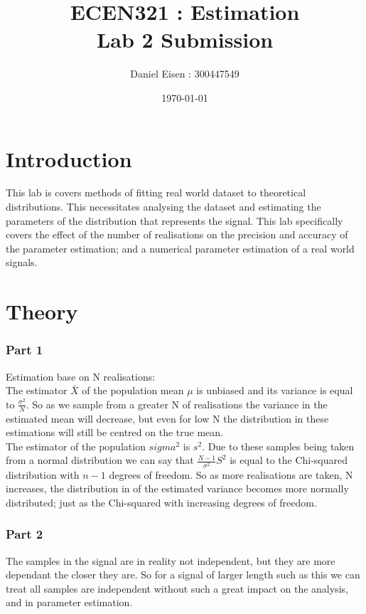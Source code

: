 \documentclass[11pt]{article}
\title{ECEN321 : Estimation \\ Lab 2 Submission}
\author{Daniel Eisen : 300447549}
\date{\today}
\begin{document}
\begin{preview}
\maketitle
\section{Introduction}
This lab is covers methods of fitting real world dataset to theoretical distributions. This necessitates analysing the dataset and estimating the parameters of the distribution that represents the signal. This lab specifically covers the effect of the number of realisations on the precision and accuracy of the parameter estimation; and a numerical parameter estimation of a real world signals.
\section{Theory}
\subsubsection*{Part 1}
Estimation base on N realisations:\\

The estimator $\bar{X}$ of the population mean $\mu$ is unbiased and its variance is equal to $\frac{\sigma^2}{N}$. So as we sample from a greater N of realisations the variance in the estimated mean will decrease, but even for low N the distribution in these estimations will still be centred on the true mean.\\

The estimator of the population $sigma^2$ is $s^2$.
Due to these samples being taken from a normal distribution we can say that $\frac{N-1}{\sigma^2}S^2$ is equal to the Chi-squared distribution with $n-1$ degrees of freedom. So as more realisations are taken, N increases, the distribution in of the estimated variance becomes more normally distributed; just as the Chi-squared with increasing degrees of freedom.


\subsubsection*{Part 2}
The samples in the signal are in reality not independent, but they are more dependant the closer they are. So for a signal of larger length such as this we can treat all samples are independent without such a great impact on the analysis, and in parameter estimation. \\


\end{preview}
\end{document}
